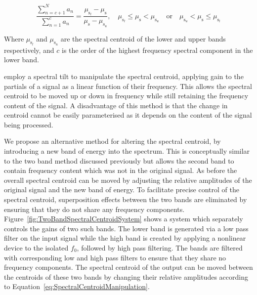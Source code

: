 			\begin{equation}
				\frac{\sum_{n = c + 1}^{N} a_{n}}
				     {{\sum_{n = 1}^{c} a_{n}}} = 
				\frac{\mu_{\mathrm{s}_{l}} - \mu_{\mathrm{s}}}{\mu_{\mathrm{s}} - \mu_{\mathrm{s}_{u}}}, 
				\quad \mu_{\mathrm{s}_{l}} \leq \mu_{\mathrm{s}} < \mu_{\mathrm{s}_{u}} \quad \text{or} 
					\quad \mu_{\mathrm{s}_{u}} < \mu_{\mathrm{s}} \leq \mu_{\mathrm{s}_{l}}
				\label{eq:SpectralCentroidManipulation}
			\end{equation}

			Where $\mu_{\mathrm{s}_{l}}$ and $\mu_{\mathrm{s}_{u}}$ are the spectral centroid of the lower and
			upper bands respectively, and $c$ is the order of the highest frequency spectral component in the
			lower band.

			\citet{williams2007perceptually} employ a spectral tilt to manipulate the spectral centroid,
			applying gain to the partials of a signal as a linear function of their frequency. This allows the
			spectral centroid to be moved up or down in frequency while still retaining the frequency content
			of the signal. A disadvantage of this method is that the change in centroid cannot be easily
			parameterised as it depends on the content of the signal being processed.

			We propose an alternative method for altering the spectral centroid, by introducing a new band of
			energy into the spectrum. This is conceptually similar to the two band method discussed previously
			but allows the second band to contain frequency content which was not in the original signal. As
			before the overall spectral centroid can be moved by adjusting the relative amplitudes of the
			original signal and the new band of energy. To facilitate precise control of the spectral centroid,
			superposition effects between the two bands are eliminated by ensuring that they do not share any
			frequency components.  Figure~\ref{fig:TwoBandSpectralCentroidSystem} shows a system which
			separately controls the gains of two such bands. The lower band is generated via a low pass filter
			on the input signal while the high band is created by applying a nonlinear device to the isolated
			$f_{0}$, followed by high pass filtering. The bands are filtered with corresponding low and high
			pass filters to ensure that they share no frequency components. The spectral centroid of the output
			can be moved between the centroids of these two bands by changing their relative amplitudes
			according to Equation~\ref{eq:SpectralCentroidManipulation}.

